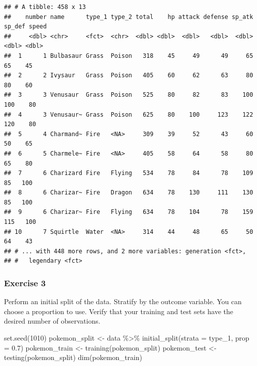 \documentclass[
]{article}
\newenvironment{Shaded}{\begin{snugshade}}{\end{snugshade}}
\newcommand{\AttributeTok}[1]{\textcolor[rgb]{0.77,0.63,0.00}{#1}}
\newcommand{\DecValTok}[1]{\textcolor[rgb]{0.00,0.00,0.81}{#1}}
\newcommand{\FloatTok}[1]{\textcolor[rgb]{0.00,0.00,0.81}{#1}}
\newcommand{\FunctionTok}[1]{\textcolor[rgb]{0.00,0.00,0.00}{#1}}
\newcommand{\NormalTok}[1]{#1}
\newcommand{\OtherTok}[1]{\textcolor[rgb]{0.56,0.35,0.01}{#1}}
\newcommand{\SpecialCharTok}[1]{\textcolor[rgb]{0.00,0.00,0.00}{#1}}
\begin{document}
\begin{verbatim}
## # A tibble: 458 x 13
##    number name      type_1 type_2 total    hp attack defense sp_atk sp_def speed
##     <dbl> <chr>     <fct>  <chr>  <dbl> <dbl>  <dbl>   <dbl>  <dbl>  <dbl> <dbl>
##  1      1 Bulbasaur Grass  Poison   318    45     49      49     65     65    45
##  2      2 Ivysaur   Grass  Poison   405    60     62      63     80     80    60
##  3      3 Venusaur  Grass  Poison   525    80     82      83    100    100    80
##  4      3 Venusaur~ Grass  Poison   625    80    100     123    122    120    80
##  5      4 Charmand~ Fire   <NA>     309    39     52      43     60     50    65
##  6      5 Charmele~ Fire   <NA>     405    58     64      58     80     65    80
##  7      6 Charizard Fire   Flying   534    78     84      78    109     85   100
##  8      6 Charizar~ Fire   Dragon   634    78    130     111    130     85   100
##  9      6 Charizar~ Fire   Flying   634    78    104      78    159    115   100
## 10      7 Squirtle  Water  <NA>     314    44     48      65     50     64    43
## # ... with 448 more rows, and 2 more variables: generation <fct>,
## #   legendary <fct>
\end{verbatim}

\hypertarget{exercise-3}{%
\subsubsection{Exercise 3}\label{exercise-3}}

Perform an initial split of the data. Stratify by the outcome variable.
You can choose a proportion to use. Verify that your training and test
sets have the desired number of observations.

\begin{Shaded}
\begin{Highlighting}[]
\FunctionTok{set.seed}\NormalTok{(}\DecValTok{1010}\NormalTok{)}
\NormalTok{pokemon\_split }\OtherTok{\textless{}{-}}\NormalTok{ data }\SpecialCharTok{\%\textgreater{}\%} 
  \FunctionTok{initial\_split}\NormalTok{(}\AttributeTok{strata =}\NormalTok{ type\_1, }\AttributeTok{prop =} \FloatTok{0.7}\NormalTok{)}
\NormalTok{pokemon\_train }\OtherTok{\textless{}{-}} \FunctionTok{training}\NormalTok{(pokemon\_split)}
\NormalTok{pokemon\_test }\OtherTok{\textless{}{-}} \FunctionTok{testing}\NormalTok{(pokemon\_split)}
\FunctionTok{dim}\NormalTok{(pokemon\_train)}
\end{Highlighting}
\end{Shaded}
\end{document}
